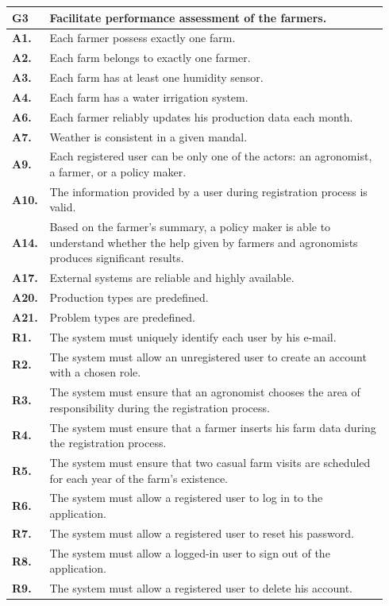 \begin{longtable}{p{0.06\linewidth} p{0.88\linewidth}} 
    \toprule
    \textbf{G3} & Facilitate performance assessment of the farmers. \\
    \midrule
    \textbf{A1.} & Each farmer possess exactly one farm.\\
    \textbf{A2.} & Each farm belongs to exactly one farmer.\\ 
    \textbf{A3.} & Each farm has at least one humidity sensor.\\ 
    \textbf{A4.} & Each farm has a water irrigation system.\\ 
    \textbf{A6.} & Each farmer reliably updates his production data each month.\\ 
    \textbf{A7.} & Weather is consistent in a given mandal.\\     
    \textbf{A9.} & Each registered user can be only one of the actors: an agronomist, a farmer, or a policy maker.\\ 
    \textbf{A10.} & The information provided by a user during registration process is valid.\\ 
    \textbf{A14.} & Based on the farmer's summary, a policy maker is able to understand whether the help given by farmers and agronomists produces significant results.\\ 
    \textbf{A17.} & External systems are reliable and highly available.\\
    \textbf{A20.} & Production types are predefined.\\
    \textbf{A21.} & Problem types are predefined.\\
    \midrule
    
	\textbf{R1.} & The system must uniquely identify each user by his e-mail. \\
	\textbf{R2.} & The system must allow an unregistered user to create an account with a chosen role. \\
	\textbf{R3.} & The system must ensure that an agronomist chooses the area of responsibility during the registration process. \\
	\textbf{R4.} & The system must ensure that a farmer inserts his farm data during the registration process.\\
	\textbf{R5.} & The system must ensure that two casual farm visits are scheduled for each year of the farm's existence.\\
	\textbf{R6.} & The system must allow a registered user to log in to the application. \\
	\textbf{R7.} & The system must allow a registered user to reset his password. \\
	\textbf{R8.} & The system must allow a logged-in user to sign out of the application. \\
	\textbf{R9.} & The system must allow a registered user to delete his account. \\
	

\end{longtable}
